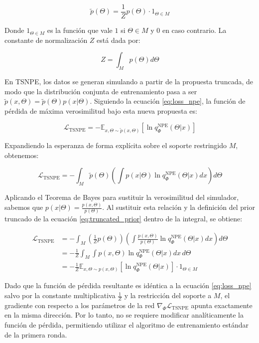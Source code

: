 \begin{equation}
\tilde{p}(\Theta) = \frac{1}{Z} p(\Theta) \cdot 1_{\Theta \in M}
\label{eq:truncated_prior}
\end{equation}

Donde $1_{\Theta \in M}$ es la función que vale $1$ si $\Theta \in M$ y $0$ en caso contrario. La constante de normalización $Z$ está dada por:

\begin{equation}
Z = \int_M p(\Theta) d\Theta
\label{eq:normalization_constant}
\end{equation}

En TSNPE, los datos se generan simulando a partir de la propuesta truncada, de modo que la distribución conjunta de entrenamiento pasa a ser $\tilde{p}(x,\Theta) = \tilde{p}(\Theta)p(x|\Theta)$. Siguiendo la ecuación \eqref{eq:loss_npe}, la función de pérdida de máxima verosimilitud bajo esta nueva propuesta es:

\begin{equation}
\mathcal{L}_{\text{TSNPE}} = - \mathbb{E}_{x,\Theta \sim \tilde{p}(x,\Theta)} \left[ \ln q_{\Phi}^{\text{NPE}}(\Theta|x) \right]
\label{eq:loss_tsnpe_expectation}
\end{equation}

Expandiendo la esperanza de forma explícita sobre el soporte restringido $M$, obtenemos:

\begin{equation}
\mathcal{L}_{\text{TSNPE}} = -\int_M \tilde{p}(\Theta) \left( \int p(x|\Theta) \ln q_{\Phi}^{\text{NPE}}(\Theta|x) dx \right) d\Theta
\label{eq:loss_integrals}
\end{equation}

Aplicando el Teorema de Bayes para sustituir la verosimilitud del simulador, sabemos que $p(x|\Theta) = \frac{p(x,\Theta)}{p(\Theta)}$. Al sustituir esta relación y la definición del prior truncado de la ecuación \eqref{eq:truncated_prior} dentro de la integral, se obtiene:

\begin{align}
\mathcal{L}_{\text{TSNPE}} &= -\int_M \left( \frac{1}{Z} p(\Theta) \right) \left( \int \frac{p(x,\Theta)}{p(\Theta)} \ln q_{\Phi}^{\text{NPE}}(\Theta|x) dx \right) d\Theta \\
&= -\frac{1}{Z} \int_M \int p(x,\Theta) \ln q_{\Phi}^{\text{NPE}}(\Theta|x) dx \, d\Theta \\
&= - \frac{1}{Z} \mathbb{E}_{x,\Theta \sim p(x,\Theta)} \left[ \ln q_{\Phi}^{\text{NPE}}(\Theta|x) \right] \cdot 1_{\Theta \in M}
\end{align}

Dado que la función de pérdida resultante es idéntica a la ecuación \eqref{eq:loss_npe} salvo por la constante multiplicativa $\frac{1}{Z}$ y la restricción del soporte a $M$, el gradiente con respecto a los parámetros de la red $\nabla_{\Phi} \mathcal{L}_{\text{TSNPE}}$ apunta exactamente en la misma dirección. Por lo tanto, no se requiere modificar analíticamente la función de pérdida, permitiendo utilizar el algoritmo de entrenamiento estándar de la primera ronda.